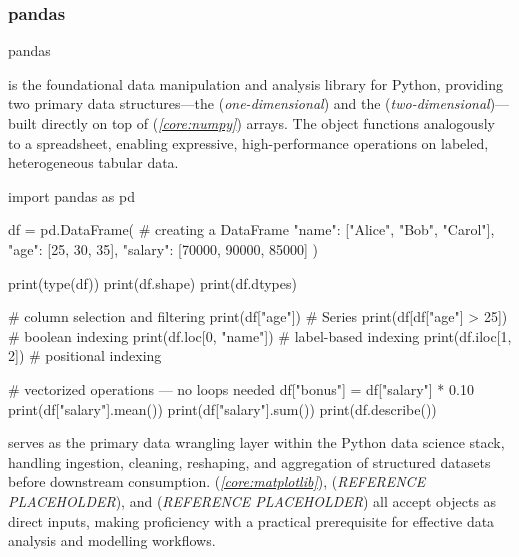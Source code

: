 \documentclass[10pt]{article}
\begin{document}
    \subsubsection{pandas}

      \begin{core}[label=core:pandas]{pandas}

        \href{https://pandas.pydata.org/docs/reference/index.html}{} is the foundational data manipulation and analysis library for Python, providing two primary data structures---the  (\textit{one-dimensional}) and the  (\textit{two-dimensional})---built directly on top of  (\textit{\autoref{core:numpy}}) arrays. The  object functions analogously to a spreadsheet, enabling expressive, high-performance operations on labeled, heterogeneous tabular data.

        \begin{pyconsole}

          import pandas as pd

          df = pd.DataFrame({ # creating a DataFrame
              "name":   ["Alice", "Bob", "Carol"],
              "age":    [25, 30, 35],
              "salary": [70000, 90000, 85000]
          })

          print(type(df))
          print(df.shape)
          print(df.dtypes)

          # column selection and filtering
          print(df["age"])         # Series
          print(df[df["age"] > 25])  # boolean indexing
          print(df.loc[0, "name"]) # label-based indexing
          print(df.iloc[1, 2])     # positional indexing

          # vectorized operations — no loops needed
          df["bonus"] = df["salary"] * 0.10
          print(df["salary"].mean())
          print(df["salary"].sum())
          print(df.describe())

        \end{pyconsole}

         serves as the primary data wrangling layer within the Python data science stack, handling ingestion, cleaning, reshaping, and aggregation of structured datasets before downstream consumption.  (\textit{\autoref{core:matplotlib}}),  (\textit{REFERENCE PLACEHOLDER}), and  (\textit{REFERENCE PLACEHOLDER}) all accept  objects as direct inputs, making proficiency with  a practical prerequisite for effective data analysis and modelling workflows.

      \end{core}
\end{document}
